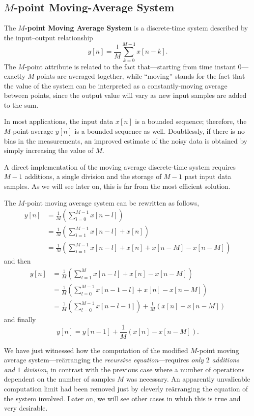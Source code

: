 \documentclass[\documentfontsize, twocolumn]{\classname}
\begin{document}
\subsection{$M$-point Moving-Average System}

The \textbf{$M$-point Moving Average System} is a discrete-time system described by the input--output relationship
\begin{equation}\label{eqn:mPointMovingAverageEquation}
    y[n] = \frac 1 M \sum_{k=0}^{M-1} x[n-k].
\end{equation}
The $M$-point attribute is related to the fact that---starting from time instant $0$---exactly $M$ points are averaged together, while ``moving'' stands for the fact that the value of the system can be interpreted as a constantly-moving average between points, since the output value will vary as new input samples are added to the sum.

In most applications, the input data $x[n]$ is a bounded sequence; therefore, the $M$-point average $y[n]$ is a bounded sequence as well. Doubtlessly, if there is no bias in the measurements, an improved estimate of the noisy data is obtained by simply increasing the value of $M$.

A direct implementation of the moving average discrete-time system requires $M-1$ additions, a single division and the storage of $M-1$ past input data samples. As we will see later on, this is far from the most efficient solution.

The $M$-point moving average system can be rewritten as follows,
\begin{align*}
    y[n] &= \frac 1 M \left(\sum_{l=0}^{M-1}x[n-l]\right) \\
         &= \frac 1 M \left(\sum_{l=1}^{M-1}x[n-l] + x[n]\right)\\
         &= \frac 1 M \left(\sum_{l=1}^{M-1}x[n-l] + x[n] + x[n - M] - x[n - M]\right)
\end{align*}
and then
\begin{align*}
    y[n] &= \frac 1 M \left(\sum_{l=1}^{M}x[n-l] + x[n] - x[n - M]\right)\\
         &= \frac 1 M \left(\sum_{l=0}^{M-1}x[n-1-l] + x[n] - x[n - M]\right)\\
         &= \frac 1 M \left(\sum_{l=0}^{M-1}x[n-l-1]\right) + \frac 1 M \left(x[n] - x[n - M]\right)
\end{align*}
and finally
\[
    y[n] = y[n-1] + \frac 1 M \left(x[n] - x[n - M]\right).
\]

We have just witnessed how the computation of the modified $M$-point moving average system---re\"arranging the \emph{recursive equation}---requires \emph{only $2$ additions and $1$ division}, in contrast with the previous case where a number of operations dependent on the number of samples $M$ was necessary. An apparently unvalicable computation limit had been removed just by cleverly re\"arranging the equation of the system involved. Later on, we will see other cases in which this is true and very desirable.
\end{document}

